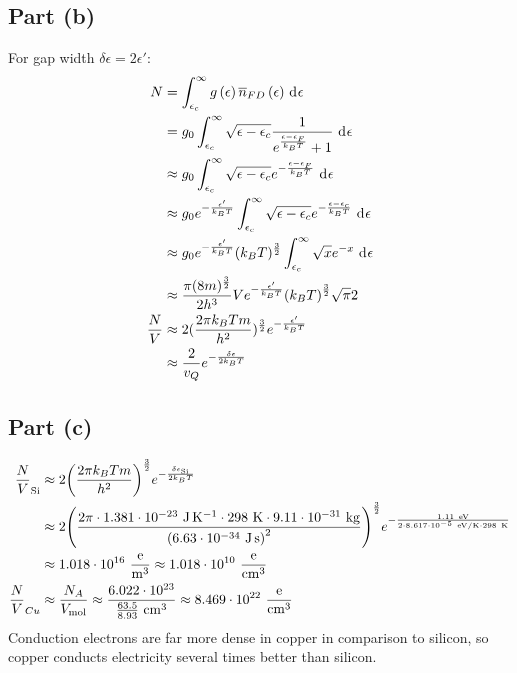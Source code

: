 \documentclass{article}
\begin{document}
\subsection*{Part (b)}
For gap width $\delta\epsilon = 2\epsilon'$:
\begin{equation}
    \begin{split}
        N & = \int_{\epsilon_c}^{\infty} g\left(\epsilon\right) \overline{n}_{FD}\left(\epsilon\right) \, \diff{\epsilon} \\
        & = g_0\int_{\epsilon_c}^{\infty} \sqrt{\epsilon - \epsilon_c}\frac{1}{e^{\frac{\epsilon - \epsilon_F}{k_BT}} + 1} \, \diff{\epsilon} \\
        & \approx g_0\int_{\epsilon_c}^{\infty} \sqrt{\epsilon - \epsilon_c}e^{-\frac{\epsilon - \epsilon_F}{k_BT}} \, \diff{\epsilon} \\
        & \approx g_0e^{-\frac{\epsilon'}{k_BT}}\int_{\epsilon_c}^{\infty} \sqrt{\epsilon - \epsilon_c}e^{-\frac{\epsilon - \epsilon_c}{k_BT}} \, \diff{\epsilon} \\
        & \approx g_0e^{-\frac{\epsilon'}{k_BT}}(k_BT)^{\frac{3}{2}}\int_{\epsilon_c}^{\infty} \sqrt{x}e^{-x} \, \diff{\epsilon} \\
        & \approx \frac{\pi(8m)^{\frac{3}{2}}}{2h^3}Ve^{-\frac{\epsilon'}{k_BT}}{\left(k_BT\right)}^{\frac{3}{2}}\sqrt{\pi}{2} \\
        \frac{N}{V} & \approx 2(\frac{2\pi k_BTm}{h^2})^{\frac{3}{2}}e^{-\frac{\epsilon'}{k_BT}} \\
        & \approx \frac{2}{v_Q}e^{-\frac{\delta\epsilon}{2k_BT}}
    \end{split}
\end{equation}
\subsection*{Part (c)}
\begin{equation}
    \begin{split}
        \frac{N}{V}_{\ce{Si}} & \approx 2{\left(\frac{2\pi k_BTm}{h^2}\right)}^{\frac{3}{2}}e^{-\frac{\delta\epsilon_{\ce{Si}}}{2k_BT}} \\
        & \approx 2{\left(\frac{2\pi \cdot 1.381 \cdot 10^{-23}~\unit{\joule\per\kelvin} \cdot 298~\unit{\kelvin} \cdot 9.11 \cdot 10^{-31}~\unit{\kilo\gram}}{{\left(6.63 \cdot 10^{-34}~\unit{\joule\second}\right)}^2}\right)}^{\frac{3}{2}}e^{-\frac{1.11~\unit{eV}}{2\cdot 8.617 \cdot 10^{-5}~\unit{eV\per\kelvin} \cdot 298~\unit{\kelvin}}} \\
        & \approx 1.018 \cdot 10^{16}~\unit{\frac{e}{\meter\cubed}}\approx 1.018 \cdot 10^{10}~\unit{\frac{e}{\centi\meter\cubed}} \\
        \frac{N}{V}_{Cu} & \approx \frac{N_A}{V_{\unit{\mol}}} \approx \frac{6.022 \cdot 10^{23}}{\frac{63.5}{8.93}~\unit{\centi\meter\cubed}} \approx 8.469 \cdot 10^{22}~\unit{\frac{e}{\centi\meter\cubed}}
    \end{split}
\end{equation}
Conduction electrons are far more dense in copper in comparison to silicon, so copper conducts electricity several times better than silicon.
\end{document}
